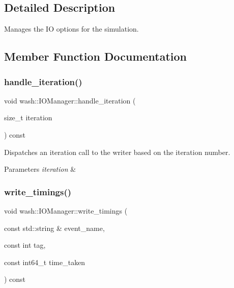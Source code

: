 \subsection{Detailed Description}
Manages the IO options for the simulation. 

\subsection{Member Function Documentation}
\mbox{\label{classwash_1_1IOManager_a37c0150160a8e7f4e97951469d9abb30}} 
\subsubsection{\texorpdfstring{handle\+\_\+iteration()}{handle\_iteration()}}
{\footnotesize\ttfamily void wash\+::\+I\+O\+Manager\+::handle\+\_\+iteration (\begin{DoxyParamCaption}\item[{size\+\_\+t}]{iteration }\end{DoxyParamCaption}) const\hspace{0.3cm}{\ttfamily [inline]}}



Dispatches an iteration call to the writer based on the iteration number. 


\begin{DoxyParams}{Parameters}
{\em iteration} & \\
\hline
\end{DoxyParams}
\mbox{\label{classwash_1_1IOManager_ae635581c17822a8f18c228952000e6cc}} 
\subsubsection{\texorpdfstring{write\+\_\+timings()}{write\_timings()}}
{\footnotesize\ttfamily void wash\+::\+I\+O\+Manager\+::write\+\_\+timings (\begin{DoxyParamCaption}\item[{const std\+::string \&}]{event\+\_\+name,  }\item[{const int}]{tag,  }\item[{const int64\+\_\+t}]{time\+\_\+taken }\end{DoxyParamCaption}) const\hspace{0.3cm}{\ttfamily [inline]}}



